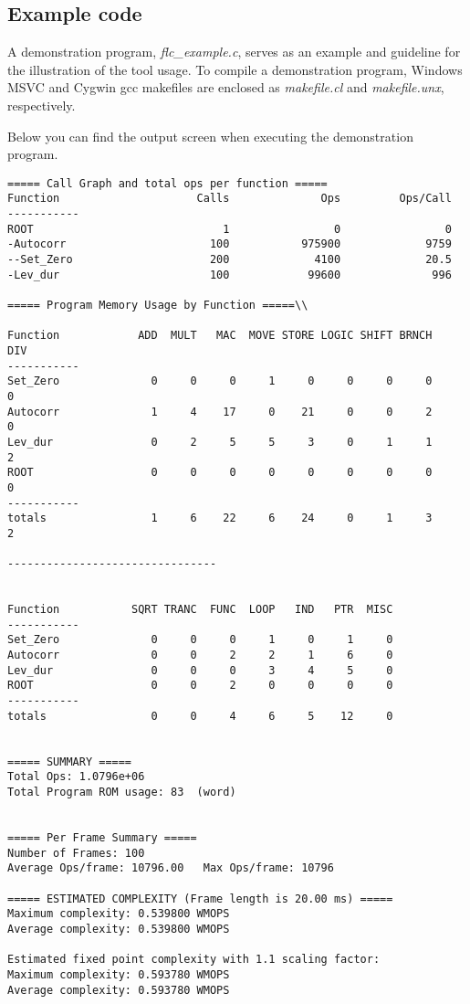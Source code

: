 \subsection{Example code}
A demonstration program, \textit{flc\_example.c}, serves as an example
and guideline for the illustration of the tool usage. To compile a
demonstration program, Windows MSVC and Cygwin gcc makefiles are
enclosed as \textit{makefile.cl} and \textit{makefile.unx},
respectively.

Below you can find the output screen when executing the demonstration program.
\begin{verbatim}
===== Call Graph and total ops per function =====
Function                     Calls              Ops         Ops/Call
-----------
ROOT                             1                0                0
-Autocorr                      100           975900             9759
--Set_Zero                     200             4100             20.5
-Lev_dur                       100            99600              996

===== Program Memory Usage by Function =====\\

Function            ADD  MULT   MAC  MOVE STORE LOGIC SHIFT BRNCH   DIV
-----------
Set_Zero              0     0     0     1     0     0     0     0     0
Autocorr              1     4    17     0    21     0     0     2     0
Lev_dur               0     2     5     5     3     0     1     1     2
ROOT                  0     0     0     0     0     0     0     0     0
-----------
totals                1     6    22     6    24     0     1     3     2

--------------------------------


Function           SQRT TRANC  FUNC  LOOP   IND   PTR  MISC
-----------
Set_Zero              0     0     0     1     0     1     0
Autocorr              0     0     2     2     1     6     0
Lev_dur               0     0     0     3     4     5     0
ROOT                  0     0     2     0     0     0     0
-----------
totals                0     0     4     6     5    12     0


===== SUMMARY =====
Total Ops: 1.0796e+06
Total Program ROM usage: 83  (word)


===== Per Frame Summary =====
Number of Frames: 100
Average Ops/frame: 10796.00   Max Ops/frame: 10796

===== ESTIMATED COMPLEXITY (Frame length is 20.00 ms) =====
Maximum complexity: 0.539800 WMOPS
Average complexity: 0.539800 WMOPS

Estimated fixed point complexity with 1.1 scaling factor:
Maximum complexity: 0.593780 WMOPS
Average complexity: 0.593780 WMOPS

\end{verbatim}
